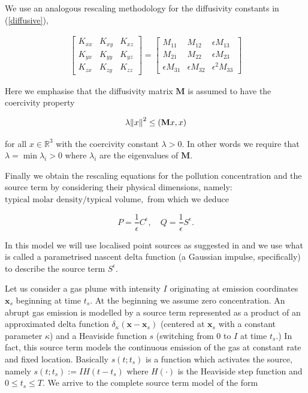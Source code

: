 \documentclass[11pt]{article}
\begin{document}
    We use an analogous rescaling methodology for the diffusivity constants in (\ref{diffusive}),
    
\begin{gather}
 \begin{bmatrix} K_{xx} & K_{xy} & K_{xz} \\ K_{yx} & K_{yy} & K_{yz} \\ K_{zx} & K_{zy} & K_{zz} \end{bmatrix}
 =
  \begin{bmatrix}
    M_{11} & M_{12} & \epsilon M_{13} \\ M_{21} & M_{22} & \epsilon M_{23} \\ \epsilon M_{31} & \epsilon M_{32} & \epsilon^2 M_{33}
  \end{bmatrix}
\end{gather}

Here we emphasise that the diffusivity matrix $\mathbf{M}$ is assumed to have the coercivity property

\begin{equation} \label{coercivity}
  \lambda \norm{x}^2 \leq (\mathbf{M} x, x)
\end{equation}

for all $x \in \mathbb{R}^3$ with the coercivity constant $\lambda > 0.$ In other words we require that $\lambda = \min {\lambda_i} > 0$ where $\lambda_i$ are the eigenvalues of $\mathbf{M}.$

Finally we obtain the rescaling equations for the pollution concentration and the source term by considering their physical dimensions, namely: $\text{typical molar density} / \text{typical volume},$ from which we deduce

    \[ P = \frac{1}{\epsilon} C^\epsilon, \quad Q = \frac{1}{\epsilon} S^\epsilon. \]

In this model we will use localised point sources as suggested in \cite{zhuk2016source} and we use what is called a parametrised nascent delta function (a Gaussian impulse, specifically) to describe the source term $S^\epsilon$.

Let us consider a gas plume with intensity $I$ originating at emission coordinates $\mathbf{x}_s$ beginning at time $t_s$. At the beginning we assume zero concentration.
An abrupt gas emission is modelled by a source term represented as a product of an approximated delta function $\delta_\kappa (\mathbf{x} - \mathbf{x}_s)$ (centered at $\mathbf{x}_s$ with a constant parameter $\kappa$) and a Heaviside function $s$ (switching from 0 to $I$ at time $t_s.$)
In fact, this source term models the continuous emission of the gas at constant rate and fixed location.
Basically $s(t;t_s)$ is a function which activates the source, namely $s(t;t_s) := IH(t - t_s)$ where $H(\cdot)$ is the Heaviside step function and $0 \leq t_s \leq T.$ We arrive to the complete source term model of the form
\end{document}

